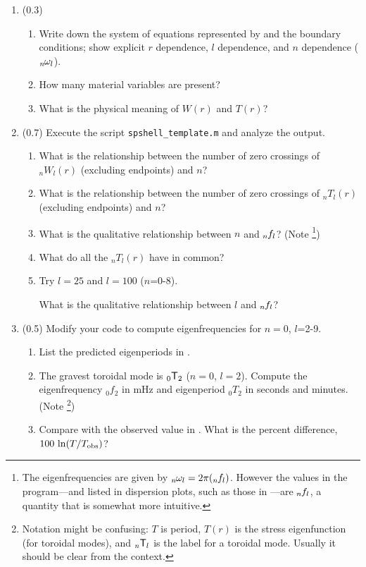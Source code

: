 \documentclass[11pt,titlepage,fleqn]{article}
\newcommand{\Tnl}{\mbox{${}_nT_l$}}
\newcommand{\Wnl}{\mbox{${}_nW_l$}}
\newcommand{\omnl}{\mbox{${}_{n\hspace{-0.2 mm}}\omega_l$}}
\newcommand{\fnl}{\mbox{${}_{n\hspace{-0.2 mm}}f_l$}}
\begin{document}
\begin{enumerate}
\item (0.3)
%
\begin{enumerate}
\item Write down the system of equations represented by  and the boundary conditions; show explicit $r$ dependence, $l$ dependence, and $n$ dependence (\eg $\omnl$).
\item How many material variables are present?
\item What is the physical meaning of $W(r)$ and $T(r)$?
\end{enumerate}


\item (0.7) Execute the script \verb+spshell_template.m+ and analyze the output.

\begin{enumerate}
\item What is the relationship between the number of zero crossings of $\Wnl(r)$ (excluding endpoints) and $n$?
\item What is the relationship between the number of zero crossings of $\Tnl(r)$ (excluding endpoints) and $n$?
\item What is the qualitative relationship between $n$ and $\fnl$? (Note \footnote{The eigenfrequencies are given by $\omnl = 2\pi(\fnl)$. However the values in the program---and listed in dispersion plots, such as those in \citet{SteinWysession}---are $\fnl$, a quantity that is somewhat more intuitive.})
\item What do all the $\Tnl(r)$ have in common?
\item Try $l=25$ and $l=100$ ($n$=0-8).

What is the qualitative relationship between $l$ and $\fnl$?
\end{enumerate}


\item (0.5) Modify your code to compute eigenfrequencies for $n=0$, $l$=2-9.
%
\begin{enumerate}
\item List the predicted eigenperiods in .
\item The gravest toroidal mode is $_0\mbox{${\sf T}$}_2$ ($n=0$, $l=2$). Compute the eigenfrequency $_0f_2$ in mHz and eigenperiod $_0T_2$ in seconds and minutes. (Note \footnote{Notation might be confusing: $T$ is period, $T(r)$ is the stress eigenfunction (for toroidal modes), and $_n\mbox{${\sf T}$}_l$ is the label for a toroidal mode. Usually it should be clear from the context.})
\item Compare with the observed value in . What is the percent difference, $100\,\ln(T/T_{\rm obs})$?
\end{enumerate}


\end{enumerate}
\end{document}
